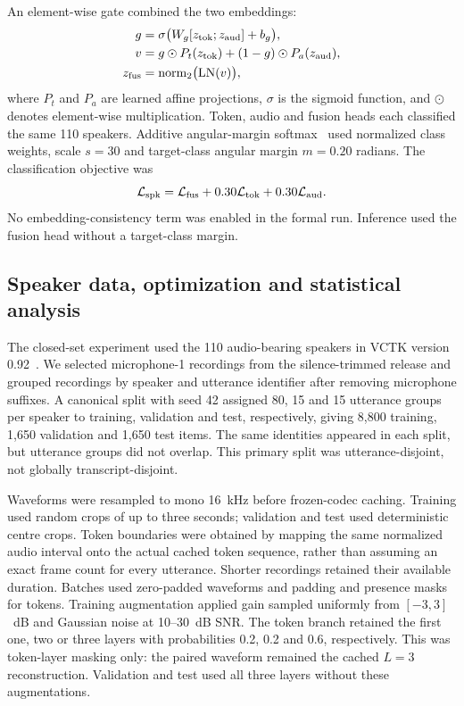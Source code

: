 \documentclass[final,5p,times,twocolumn]{elsarticle}
\begin{document}
An element-wise gate combined the two embeddings:
\begin{equation}
\begin{aligned}
 g&=\sigma\bigl(W_g[z_{\rm tok};z_{\rm aud}]+b_g\bigr),\\
 v&=g\odot P_t(z_{\rm tok})+(1-g)\odot P_a(z_{\rm aud}),\\
 z_{\rm fus}&=\operatorname{norm}_2\bigl(\operatorname{LN}(v)\bigr),
\end{aligned}
\end{equation}
where $P_t$ and $P_a$ are learned affine projections, $\sigma$ is the sigmoid function, and $\odot$ denotes element-wise multiplication. Token, audio and fusion heads each classified the same 110 speakers. Additive angular-margin softmax~\cite{arcface} used normalized class weights, scale $s=30$ and target-class angular margin $m=0.20$ radians. The classification objective was
\begin{equation}
 \mathcal L_{\rm spk}
 =\mathcal L_{\rm fus}
  +0.30\mathcal L_{\rm tok}
  +0.30\mathcal L_{\rm aud}.
\end{equation}
No embedding-consistency term was enabled in the formal run. Inference used the fusion head without a target-class margin.

\subsection{Speaker data, optimization and statistical analysis}
The closed-set experiment used the 110 audio-bearing speakers in VCTK version 0.92~\cite{vctk}. We selected microphone-1 recordings from the silence-trimmed release and grouped recordings by speaker and utterance identifier after removing microphone suffixes. A canonical split with seed 42 assigned 80, 15 and 15 utterance groups per speaker to training, validation and test, respectively, giving 8,800 training, 1,650 validation and 1,650 test items. The same identities appeared in each split, but utterance groups did not overlap. This primary split was utterance-disjoint, not globally transcript-disjoint.

Waveforms were resampled to mono 16~kHz before frozen-codec caching. Training used random crops of up to three seconds; validation and test used deterministic centre crops. Token boundaries were obtained by mapping the same normalized audio interval onto the actual cached token sequence, rather than assuming an exact frame count for every utterance. Shorter recordings retained their available duration. Batches used zero-padded waveforms and padding and presence masks for tokens. Training augmentation applied gain sampled uniformly from $[-3,3]$~dB and Gaussian noise at 10--30~dB SNR. The token branch retained the first one, two or three layers with probabilities 0.2, 0.2 and 0.6, respectively. This was token-layer masking only: the paired waveform remained the cached $L=3$ reconstruction. Validation and test used all three layers without these augmentations.
\end{document}
